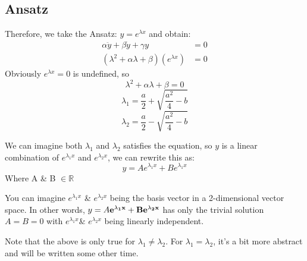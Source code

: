 \documentclass{article}
\begin{document}
 \subsection{Ansatz}
 Therefore, we take the Ansatz: $y=e^{\lambda x}$ and obtain:
 \begin{align}
 \alpha \ddot{y}+ \beta\dot{y}+ \gamma y &= 0\\
     ({\lambda}^2 + \alpha\lambda  + \beta)(e^{\lambda x}) &=0
\end{align}
     Obviously $e^{\lambda x}=0$ is undefined, so 
     \begin{equation}
     {\lambda}^2 + \alpha\lambda  + \beta=0
     \end{equation}
     \begin{equation}
     \lambda_1=\frac{a}{2}+\sqrt{\frac{a^2}{4}-b} 
     \end{equation}
     \begin{equation}
     \lambda_2=\frac{a}{2}-\sqrt{\frac{a^2}{4}-b}
     \end{equation}
     
     We can imagine both $\lambda_1$ and $\lambda_2$ satisfies the equation, so $y$ is a linear combination of $e^{\lambda_1 x}$ and $e^{\lambda_2 x}$, we can rewrite this as:
     \begin{equation}
         y=Ae^{\lambda_1 x}+Be^{\lambda_1 x}
     \end{equation}
     Where A \& B $\in \mathbb{R}$
     
     You can imagine $e^{\lambda_1 x}$ \& $e^{\lambda_2 x}$ being the basis vector in a 2-dimensional vector space. In other words, $y=A\bf{e^{\lambda_1 x}}+B\bf{e^{\lambda_2 x}}$ has only the trivial solution $A=B=0$ with  $e^{\lambda_1 x}$\& $e^{\lambda_2 x}$ being linearly independent. 
     
     Note that the above is only true for $\lambda_1 \ne \lambda_2$. For $\lambda_1 = \lambda_2$, it's a bit more abstract and will be written some other time.
 
\end{document}
